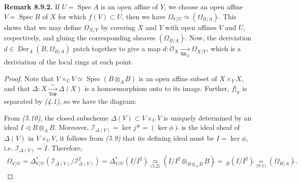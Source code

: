 \documentclass[11pt,a4paper,footinclude=true,headinclude=true]{scrbook} %
\newcommand{\acton}{\rotatebox{180}{$\,\circlearrowright$}}
\DeclareMathOperator{\Spec}{Spec}
\DeclareMathOperator{\Der}{Der}
\newcommand{\II}{\mathscr{I}}
\newcommand{\OO}{\mathcal{O}}
\newcommand{\Ab}{\mathfrak{Ab}}
\newcommand{\Top}{\mathfrak{Top}}
\newcommand{\<}{\langle}
\newcommand{\>}{\rangle}
\newcommand\Comm[2][\acton]{%
  \arrow[mysymbol]{#2}[description]{#1}}
\newenvironment{remark}[2][Remark]
    { \begin{mdframed}[backgroundcolor=gray!20] \textbf{#1 #2.} }
    {  \end{mdframed}}
\begin{document}
\begin{remark}{8.9.2}
    If $U=\Spec A$ is an open affine of $Y$, we choose an open affine $V=\Spec B$ of $X$ for which $f(V)\subset U$, then we have $\Omega_{V/U}\simeq(\Omega_{B/A})\widetilde{}$. This shows that we may define $\Omega_{X/Y}$ by covering $X$ and $Y$ with open affines $V$ and $U$, respectively, and gluing the corresponding sheaves $(\Omega_{B/A})\widetilde{}$. Now, the deriviation $d\in\Der_A(B,\Omega_{B/A})$ patch together to give a map $d:\OO_X\xrightarrow[\Ab_X]{}\Omega_{X/Y}$, which is a deriviation of the local rings at each point.
\end{remark}
\begin{proof}
    Note that $V\times_UV\simeq\Spec(B\otimes_AB)$ is an open affine subset of $X\times_YX$, and that $\Delta:X\xrightarrow[\Top]{\sim}\Delta(X)$ is a homoemorphism onto to its image. Further, $f|_V$ is separated by \textit{(4.1)}, so we have the diagram:
    \begin{center}
    \end{center}
    From \textit{(5.10)}, the closed subscheme $\Delta(V)\subset V\times_UV$ is uniquely determined by an ideal $I\triangleleft B\otimes_AB$. Moreover, $\II_{\Delta(V)}=\ker j^\#=(\ker\phi)\widetilde{}$ is the ideal sheaf of $\Delta(V)$ in $V\times_UV$, it follows from \textit{(5.9)} that its defining ideal must be $I=\ker\phi$, i.e. $\II_{\Delta(V)}=\widetilde{I}$. Therefore, 
    \begin{align*}
        \Omega_{V/U}=\Delta^\ast_{V/U}(\II_{\Delta(V)}/\II_{\Delta(V)}^2)=\Delta_{V/U}^\ast(I/I^2)\widetilde{}\underset{\textit{(5.2)}}{\simeq}(I/I^2\otimes_{B\otimes_AB}B)\widetilde{}=\,_B(I/I^2)\widetilde{}\underset{\textit{(8.1)}}{=}(\Omega_{B/A})\widetilde{}.
    \end{align*}
\end{proof}
\end{document}
